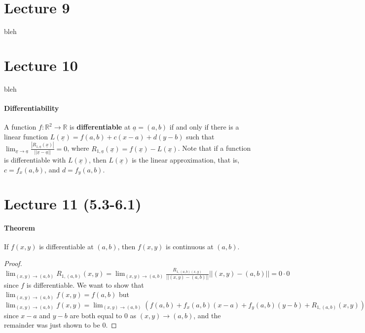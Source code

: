 \documentclass[tikz,10pt,letter]{article}
\theoremstyle{plain}
\theoremstyle{definition}
\begin{document}
\section*{Lecture 9}
bleh

\section*{Lecture 10}
bleh

\paragraph{Differentiability} A function $f:\mathbb{R}^2\rightarrow\mathbb{R}$ is \textbf{differentiable} at $\underline{a}=(a,b)$ if and only if there is a linear function $L(\underline{x})=f(a,b)+c(x-a)+d(y-b)$ such that $\lim_{\underline{x}\rightarrow\underline{a}}\frac{|R_{1,\underline{a}}(\underline{x})|}{||\underline{x}-\underline{a}||}=0$, where $R_{1,\underline{a}}(\underline{x})=f(\underline{x})-L(\underline{x})$. Note that if a function is differentiable with $L(\underline{x})$, then $L(\underline{x})$ is the linear approximation, that is, $c=f_x(a,b)$, and $d=f_y(a,b)$. 


\section*{Lecture 11 (5.3-6.1)}
\paragraph{Theorem}
If $f(x,y)$ is differentiable at $(a,b)$, then $f(x,y)$ is continuous at $(a,b)$. 
\begin{proof}
     $\lim_{(x,y)\rightarrow(a,b)}R_{1,(a,b)}(x,y)=\lim_{(x,y)\rightarrow(a,b)}\frac{R_{1,(a,b)(x,y)}}{||(x,y)-(a,b)||}||(x,y)-(a,b)||=0\cdot0$ since $f$ is differentiable. We want to show that $\lim_{(x,y)\rightarrow(a,b)}f(x,y)=f(a,b)$ but $\lim_{(x,y)\rightarrow(a,b)}f(x,y)=\lim_{(x,y)\rightarrow(a,b)}\left(f(a,b)+f_x(a,b)(x-a)+f_y(a,b)(y-b)+R_{1,(a,b)}(x,y)\right)=f(a,b)+0+0+0$ since $x-a$ and $y-b$ are both equal to $0$ as $(x,y)\rightarrow(a,b)$, and the remainder was just shown to be $0$. 
\end{proof}
\end{document}
